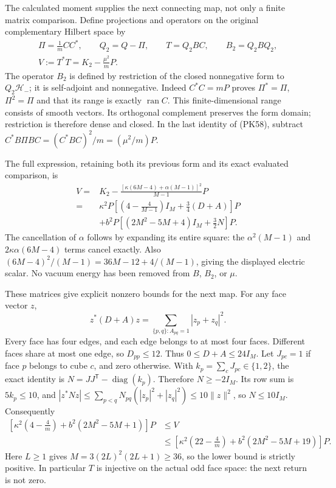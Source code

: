 \documentclass[11pt]{article}
\begin{document}
The calculated moment supplies the next connecting map, not only a finite
matrix comparison. Define projections and operators on the original
complementary Hilbert space by
\[
\begin{gathered}
 \Pi=\frac1mCC^*,\qquad Q_2=Q-\Pi,\qquad
 T=Q_2BC,\qquad B_2=Q_2BQ_2,\\
 V:=T^*T=K_2-\frac{\mu^2}{m}P .
\end{gathered}\tag{PK58}
\]
The operator \(B_2\) is defined by restriction of the closed nonnegative
form to \(Q_2\mathcal H_-\); it is self-adjoint and nonnegative.
Indeed \(C^*C=mP\) proves \(\Pi^*=\Pi\), \(\Pi^2=\Pi\) and that its
range is exactly \(\operatorname{ran}C\). This finite-dimensional range
consists of smooth vectors. Its orthogonal complement preserves the form
domain; restriction is therefore dense and closed.
In the last identity of (PK58), subtract
\(C^*B\Pi BC=(C^*BC)^2/m=(\mu^2/m)P\).

The full expression, retaining both its previous form and its exact
evaluated comparison, is
\[
\begin{aligned}
 V={}&K_2-\frac{[\kappa(6M-4)+\alpha(M-1)]^2}{M-1}P\\
 ={}&\kappa^2P\left[
     \left(4-\frac4{M-1}\right)I_M+\frac34(D+A)\right]P\\
 &+b^2P\left[(2M^2-5M+4)I_M+\frac32N\right]P .
\end{aligned}\tag{PK59}
\]
The cancellation of \(\alpha\) follows by expanding its entire square:
the \(\alpha^2(M-1)\) and \(2\kappa\alpha(6M-4)\) terms cancel exactly.
Also
\((6M-4)^2/(M-1)=36M-12+4/(M-1)\), giving the displayed electric scalar.
No vacuum energy has been removed from \(B\), \(B_2\), or \(\mu\).

These matrices give explicit nonzero bounds for the next map. For any face
vector \(z\),
\[
 z^*(D+A)z=\sum_{\{p,q\}:A_{pq}=1}|z_p+z_q|^2.
\]
Every face has four edges, and each edge belongs to at most four faces.
Different faces share at most one edge, so \(D_{pp}\le12\). Thus
\(0\le D+A\le24I_M\).
Let \(J_{pc}=1\) if face \(p\) belongs to cube \(c\), and zero otherwise.
With \(k_p=\sum_cJ_{pc}\in\{1,2\}\), the exact identity is
\(N=JJ^{\mathsf T}-\operatorname{diag}(k_p)\). Therefore \(N\ge-2I_M\).
Its row sum is \(5k_p\le10\), and
\(\left|z^*Nz\right|\le\sum_{p<q}N_{pq}(|z_p|^2+|z_q|^2)
\le10\|z\|^2\), so \(N\le10I_M\).
Consequently
\[
\begin{aligned}
 \left[\kappa^2\left(4-\frac4m\right)
                  +b^2(2M^2-5M+1)\right]P
 &\le V\\
 &\le
 \left[\kappa^2\left(22-\frac4m\right)
                  +b^2(2M^2-5M+19)\right]P.
\end{aligned}\tag{PK60}
\]
Here \(L\ge1\) gives \(M=3(2L)^2(2L+1)\ge36\), so the lower bound is
strictly positive. In particular \(T\) is injective on the actual odd face
space: the next return is not zero.
\end{document}
